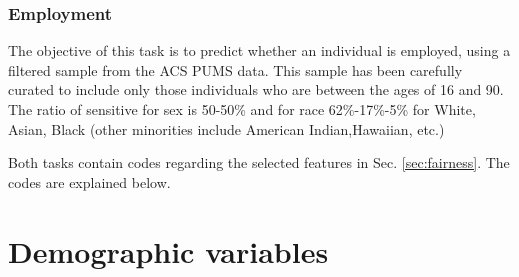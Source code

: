 \subsubsection{Employment}

The objective of this task is to predict whether an individual is employed, using a filtered sample from the ACS PUMS data. This sample has been carefully curated to include only those individuals who are between the ages of 16 and 90.  The ratio of sensitive for sex is 50-50\% and for race 62\%-17\%-5\% for White, Asian, Black (other minorities include American Indian,Hawaiian, etc.)

Both tasks contain codes regarding the selected features in Sec. \ref{sec:fairness}. The codes are explained below.

\section*{Demographic variables}
